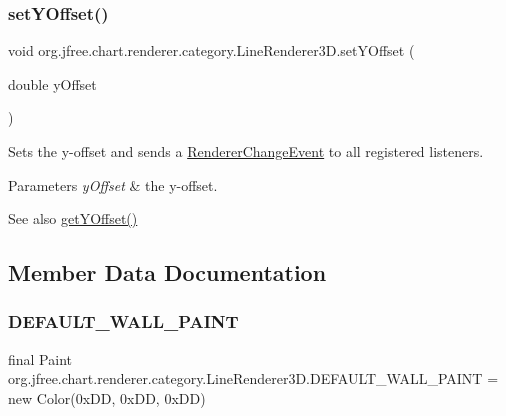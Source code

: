 \subsubsection{\texorpdfstring{set\+Y\+Offset()}{setYOffset()}}
{\footnotesize\ttfamily void org.\+jfree.\+chart.\+renderer.\+category.\+Line\+Renderer3\+D.\+set\+Y\+Offset (\begin{DoxyParamCaption}\item[{double}]{y\+Offset }\end{DoxyParamCaption})}

Sets the y-\/offset and sends a \mbox{\hyperlink{}{Renderer\+Change\+Event}} to all registered listeners.


\begin{DoxyParams}{Parameters}
{\em y\+Offset} & the y-\/offset.\\
\hline
\end{DoxyParams}
\begin{DoxySeeAlso}{See also}
\mbox{\hyperlink{classorg_1_1jfree_1_1chart_1_1renderer_1_1category_1_1_line_renderer3_d_aeaf2b0eef57a0a0b9dbcf5b56af1c5fa}{get\+Y\+Offset()}} 
\end{DoxySeeAlso}


\subsection{Member Data Documentation}
\mbox{\label{classorg_1_1jfree_1_1chart_1_1renderer_1_1category_1_1_line_renderer3_d_a0957fe0c53371a9c9f10d7ce4b69bd2a}} 
\subsubsection{\texorpdfstring{D\+E\+F\+A\+U\+L\+T\+\_\+\+W\+A\+L\+L\+\_\+\+P\+A\+I\+NT}{DEFAULT\_WALL\_PAINT}}
{\footnotesize\ttfamily final Paint org.\+jfree.\+chart.\+renderer.\+category.\+Line\+Renderer3\+D.\+D\+E\+F\+A\+U\+L\+T\+\_\+\+W\+A\+L\+L\+\_\+\+P\+A\+I\+NT = new Color(0x\+D\+D, 0x\+D\+D, 0x\+D\+D)\hspace{0.3cm}{\ttfamily [static]}}

